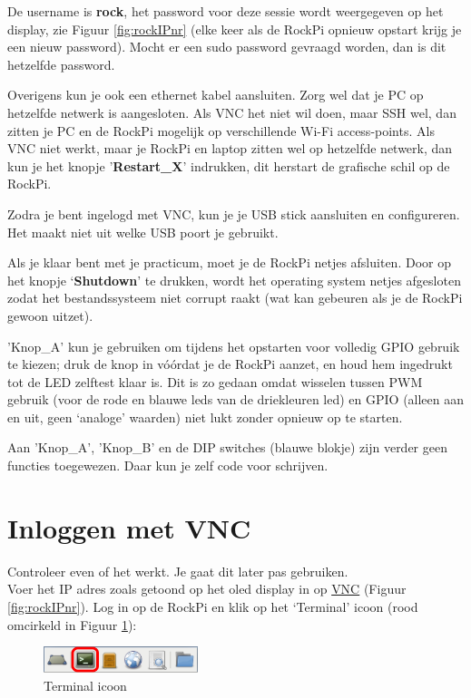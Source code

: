 De username is \textbf{rock}, het password voor deze sessie wordt weergegeven op het display, zie Figuur \ref{fig:rockIPnr} (elke keer als de RockPi opnieuw opstart krijg je een nieuw password). Mocht er een sudo password gevraagd worden, dan is dit hetzelfde password.

Overigens kun je ook een ethernet kabel aansluiten.
Zorg wel dat je PC op hetzelfde netwerk is aangesloten. Als VNC het niet wil doen, maar SSH wel, dan zitten je PC en de RockPi mogelijk op verschillende Wi-Fi access-points. Als VNC niet werkt, maar je RockPi en laptop zitten wel op hetzelfde netwerk, dan kun je het knopje '\textbf{Restart\_X}' indrukken, dit herstart de grafische schil op de RockPi.

Zodra je bent ingelogd met VNC, kun je je USB stick aansluiten en configureren. Het maakt niet uit welke USB poort je gebruikt. 

Als je klaar bent met je practicum, moet je de RockPi netjes afsluiten. Door op het knopje ‘\textbf{Shutdown}’ te drukken, wordt het operating system netjes afgesloten zodat het bestandssysteem niet corrupt raakt (wat kan gebeuren als je de RockPi gewoon uitzet).

'Knop\_A' kun je gebruiken om tijdens het opstarten voor volledig GPIO gebruik te kiezen; druk de knop in vóórdat je de RockPi aanzet, en houd hem ingedrukt tot de LED zelftest klaar is. Dit is zo gedaan omdat wisselen tussen PWM gebruik (voor de rode en blauwe leds van de driekleuren led) en GPIO (alleen aan en uit, geen ‘analoge’ waarden) niet lukt zonder opnieuw op te starten.

Aan 'Knop\_A', 'Knop\_B' en de DIP switches (blauwe blokje) zijn verder geen functies toegewezen. Daar kun je zelf code voor schrijven.

\section{Inloggen met VNC}
Controleer even of het werkt. Je gaat dit later pas gebruiken. \\Voer het IP adres zoals getoond op het oled display in op \hyperlink{chp:vnc}{VNC}  (Figuur \ref{fig:rockIPnr}).\newline
Log in op de RockPi en klik op het ‘Terminal’ icoon (rood omcirkeld in Figuur \ref{fig:termico}):
\begin{figure}[h!]
	\centering
	\begin{center} 	
		\includegraphics[width=0.4\textwidth]{figuren/Terminal-icoon}
		\caption{Terminal icoon}
		\label{fig:termico}   
	\end{center}
\end{figure}

